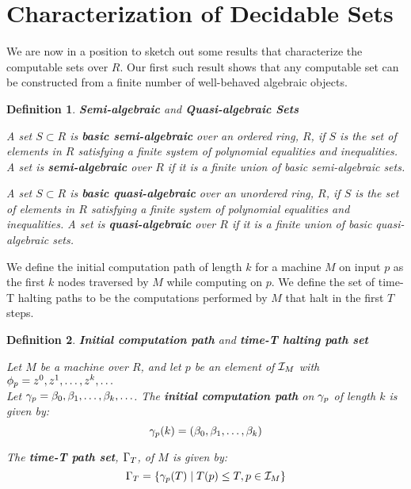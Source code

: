 \documentclass[twoside]{article}
\newtheorem{definition}{Definition}[section]
\begin{document}
\section{Characterization of Decidable Sets}

  We are now in a position to sketch out some results that
  characterize the computable sets over $R$.  Our first such result
  shows that any computable set can be constructed from a finite number
  of well-behaved algebraic objects.

  \begin{definition}{\textbf{Semi-algebraic} and \textbf{Quasi-algebraic Sets}}
    
    A set $S \subset R$ is \textbf{basic semi-algebraic} over an
    ordered ring, $R$, if $S$ is the set of elements in $R$ satisfying
    a finite system of polynomial equalities and inequalities. A set
    is \textbf{semi-algebraic} over $R$ if it is a finite union of basic
    semi-algebraic sets.

    A set $S \subset R$ is \textbf{basic quasi-algebraic} over an
    unordered ring, $R$, if $S$ is the set of elements in $R$ satisfying
    a finite system of polynomial equalities and inequalities. A set
    is \textbf{quasi-algebraic} over $R$ if it is a finite union of basic
    quasi-algebraic sets.
    
  \end{definition}

  We define the initial computation path of length $k$ for a machine
  $M$ on input $p$ as the first $k$ nodes traversed by $M$ while computing
  on $p$.  We define the set of time-T halting paths to be the computations
  performed by $M$ that halt in the first $T$ steps.

  \begin{definition}{\textbf{Initial computation path} and \textbf{time-T halting path set}}

    Let $M$ be a machine over $R$, and let $p$ be an element of
    $\mathcal{I}_M$ with $\phi_p = z^0, z^1, \ldots, z^k, \ldots$ \\
    Let $\gamma_p = \beta_0, \beta_1, \ldots, \beta_k, \ldots$.  
    The \textbf{initial computation path} on $\gamma_p$ of
    length $k$ is given by: 
    $$\gamma_p(k) = (\beta_0, \beta_1, \ldots,\beta_k)$$

    The \textbf{time-T path set}, $\Gamma_{T}$, of $M$ is given by:
    $$\Gamma_{T} = \{\gamma_p(T) \mid T(p) \leq T, p \in \mathcal{I}_M\}$$

  \end{definition}
  
\end{document}
